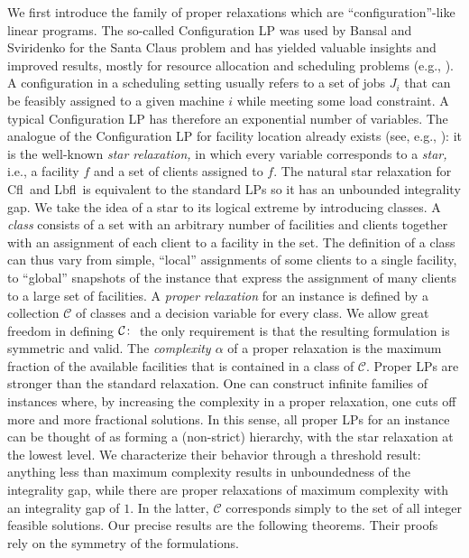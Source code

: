 \documentclass[11pt]{article}\usepackage{amsmath}
\newcommand{\lbfl}{{\sc Lbfl}}
\newcommand{\cfl}{{\sc Cfl}}
\begin{document}
We first introduce    
the family of  proper relaxations
which are ``configuration''-like linear programs.
The so-called Configuration LP was  used by 
Bansal and Sviridenko 
\cite{BansalS06} for the Santa Claus problem and has yielded valuable insights
and improved results, mostly
for resource allocation  and scheduling problems
(e.g., \cite{Svensson11, AsadpourFS11,
HaeuplerSS11, SviridenkoW13}).
A configuration in a scheduling setting usually refers to a set of
jobs $J_i$ that
can be feasibly assigned to a given  machine $i$ while meeting some load
constraint. A typical Configuration LP has therefore    an exponential number of
variables.    
The analogue of the Configuration
LP for facility location already exists (see, e.g., \cite{JainMMSV03}): it is the well-known 
{\em star relaxation,} in which every  variable corresponds to a {\em star,} i.e., a
facility $f$ and a set
of clients assigned to $f.$ 
The natural star relaxation 
for   \cfl\ and \lbfl\  is  equivalent to the standard LPs 
so it has an unbounded integrality gap.  
We take the idea of a star  to its logical  extreme by 
introducing  classes. 
A {\em class} consists of a set with an arbitrary number of facilities and clients
together with an 
assignment of each client to a facility in the set. 
The definition
of a class can thus vary from simple, ``local'' 
assignments of  some clients to  a  single facility, to  
 ``global'' snapshots  of the instance that 
express  the assignment  of many
clients to a large set of  facilities.  
A {\em proper relaxation} for an instance is defined by a collection
$\mathcal{C}$ of classes and a decision variable for every class. 
We allow great freedom in 
defining  ${\cal C}\colon$ 
the only requirement   is that the resulting
formulation is symmetric and valid. 
The {\em complexity $\alpha$} of a proper relaxation is the maximum fraction
 of the 
available facilities that is contained in a class of $\mathcal{C}.$
Proper LPs are stronger than the standard relaxation. 
One can
construct infinite 
families  of instances 
where, by  increasing the complexity in a proper relaxation, one cuts off  more
and more fractional solutions.  
In this sense, all proper LPs for an instance can
be  thought of as forming  a (non-strict)    hierarchy, with the star
relaxation at the lowest level. 
We characterize their behavior  through a threshold result: 
anything less than maximum complexity results in unboundedness of
the integrality gap, while there are
proper relaxations of maximum complexity with an integrality gap of
$1$.  In the latter, $\mathcal{C}$ corresponds simply to 
the set of all integer feasible solutions. 
Our precise results 
are the following theorems. Their proofs rely 
on the symmetry of the formulations. 
\end{document}
